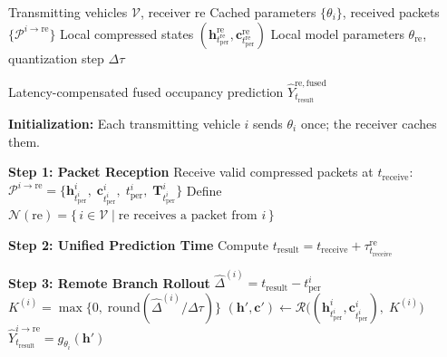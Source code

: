 \begin{algorithm}[t]
\caption{Dual-latency Prediction Compensation with Vehicle-Specific Prediction Model (VSPM)}
\label{alg:dual_latency}
\begin{algorithmic}[1]

    \Require Transmitting vehicles \ensuremath{\mathcal{V}}, receiver \ensuremath{\mathrm{re}}
    \Require Cached parameters \ensuremath{\{\theta_i\}}, received packets \ensuremath{\{\mathcal{P}^{i\rightarrow\mathrm{re}}\}}
    \Require Local compressed states \ensuremath{(\mathbf{h}^{\mathrm{re}}_{t^{\mathrm{re}}_{\mathrm{per}}}, \mathbf{c}^{\mathrm{re}}_{t^{\mathrm{re}}_{\mathrm{per}}})}
    \Require Local model parameters \ensuremath{\theta_{\mathrm{re}}}, quantization step \ensuremath{\Delta\tau}

    \Ensure Latency-compensated fused occupancy prediction \ensuremath{\widehat{Y}^{\mathrm{re},\mathrm{fused}}_{t_{\mathrm{result}}}}

    \State \textbf{Initialization:} Each transmitting vehicle \ensuremath{i} sends \ensuremath{\theta_i} once; the receiver caches them.

    \State \textbf{Step 1: Packet Reception}
    \State Receive valid compressed packets at \ensuremath{t_{\mathrm{receive}}}:
    \Statex \hspace{\algorithmicindent}%
    \ensuremath{\mathcal{P}^{i\rightarrow\mathrm{re}}
      = \{\mathbf{h}^i_{t^i_{\mathrm{per}}},\; \mathbf{c}^i_{t^i_{\mathrm{per}}},\; t^i_{\mathrm{per}},\; \mathbf{T}^i_{t^i_{\mathrm{per}}}\}}
    \State Define $\mathcal{N}(\mathrm{re}) = \{\, i \in \mathcal{V} \mid \mathrm{re} \text{ receives a packet from } i \,\}$


    \State \textbf{Step 2: Unified Prediction Time}
    \State Compute \ensuremath{t_{\mathrm{result}} = t_{\mathrm{receive}} + \tau^{\mathrm{re}}_{t_{\mathrm{receive}}}}

    \State \textbf{Step 3: Remote Branch Rollout}
        \State \ensuremath{\widehat{\Delta}^{(i)} = t_{\mathrm{result}} - t^i_{\mathrm{per}}}
        \State \ensuremath{K^{(i)} = \max\{0,\; \mathrm{round}(\widehat{\Delta}^{(i)}/\Delta\tau)\}}
        \State \ensuremath{(\mathbf{h}',\mathbf{c}') \gets \mathcal{R}\bigl((\mathbf{h}^i_{t^i_{\mathrm{per}}}, \mathbf{c}^i_{t^i_{\mathrm{per}}}),\; K^{(i)}\bigr)}
        \State \ensuremath{\widehat{Y}^{i\rightarrow\mathrm{re}}_{t_{\mathrm{result}}} = g_{\theta_i}(\mathbf{h}')}
    \EndFor


\end{algorithmic}
\end{algorithm}
